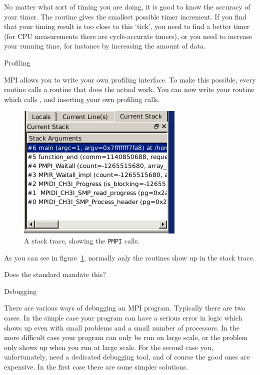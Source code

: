 No matter what sort of timing you are doing, it is good to know the accuracy of your timer.
The routine  gives the smallest possible timer increment.
If you find that your timing result is too close to this `tick', you need to find a better timer
(for CPU measurements there are cycle-accurate timers), or you need to increase
your running time, for instance by increasing the amount of data.


 {Profiling}

MPI allows you to write your own profiling interface. To make this possible,
every routine  calls a routine  that 
does the actual work. You can now write your  routine
which calls , and inserting your own profiling calls.
\begin{figure}
  \includegraphics[scale=.7]{graphics/pmpi}
  \caption{A stack trace, showing the \texttt{PMPI} calls.}
  \label{fig:pmpi}
\end{figure}
As you can see in figure~\ref{fig:pmpi}, normally only the  routines
show up in the stack trace.

Does the standard mandate this?

 {Debugging}
\label{sec:debug}

There are various ways of debugging an MPI program. Typically there
are two cases. In the simple case your program can have a serious
error in logic which shows up even with small problems and a small
number of processors. In the more difficult case your program can only
be run on large scale, or the problem only shows up when you run at
large scale. For the second case you, unfortunately, need a dedicated
debugging tool, and of course the good ones are expensive. In the
first case there are some simpler solutions.


